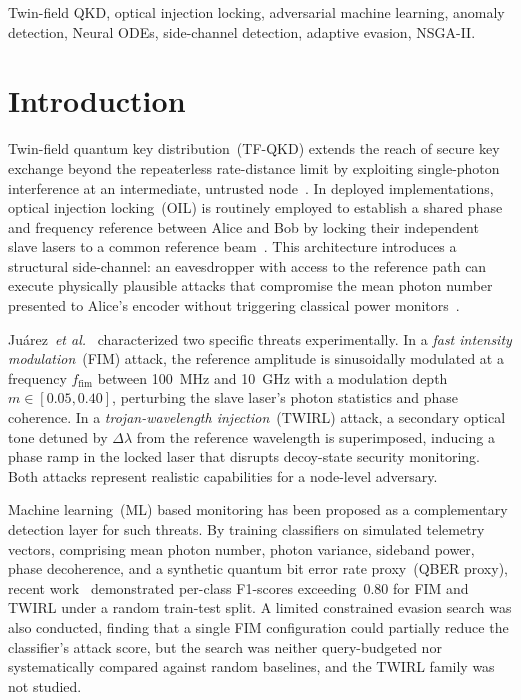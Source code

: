 \documentclass[journal,twocolumn]{IEEEtran}
\begin{document}
\begin{IEEEkeywords}
Twin-field QKD, optical injection locking, adversarial machine learning,
anomaly detection, Neural ODEs, side-channel detection,
adaptive evasion, NSGA-II.
\end{IEEEkeywords}

\section{Introduction}
\label{sec:intro}

Twin-field quantum key distribution~(TF-QKD) extends the reach of secure key
exchange beyond the repeaterless rate-distance limit by exploiting single-photon
interference at an intermediate, untrusted node~\cite{lucamarini2018,wang2018}.
In deployed implementations, optical injection locking~(OIL) is routinely employed
to establish a shared phase and frequency reference between Alice and Bob by
locking their independent slave lasers to a common reference
beam~\cite{pirandola2020,roberts2017}. This architecture introduces a structural
side-channel: an eavesdropper with access to the reference path can execute
physically plausible attacks that compromise the mean photon number presented to
Alice's encoder without triggering classical power monitors~\cite{juarez2026}.

Juárez~\emph{et al.}~\cite{juarez2026} characterized two specific threats
experimentally. In a \emph{fast intensity modulation}~(FIM) attack, the reference
amplitude is sinusoidally modulated at a frequency $f_\mathrm{fim}$ between
\SI{100}{\mega\hertz} and \SI{10}{\giga\hertz} with a modulation depth
$m \in [0.05, 0.40]$, perturbing the slave laser's photon statistics and phase
coherence. In a \emph{trojan-wavelength injection}~(TWIRL) attack, a secondary
optical tone detuned by $\Delta\lambda$ from the reference wavelength is superimposed,
inducing a phase ramp in the locked laser that disrupts decoy-state security
monitoring. Both attacks represent realistic capabilities for a node-level adversary.

Machine learning~(ML) based monitoring has been proposed as a complementary detection
layer for such threats. By training classifiers on simulated telemetry vectors,
comprising mean photon number, photon variance, sideband power, phase decoherence,
and a synthetic quantum bit error rate proxy~(QBER proxy), recent work~\cite{basepaper} 
demonstrated per-class F1-scores exceeding~$0.80$ for FIM and TWIRL under a random 
train-test split. A limited constrained evasion search was also conducted, finding that a
single FIM configuration could partially reduce the classifier's attack score, but
the search was neither query-budgeted nor systematically compared against random
baselines, and the TWIRL family was not studied.
\end{document}
